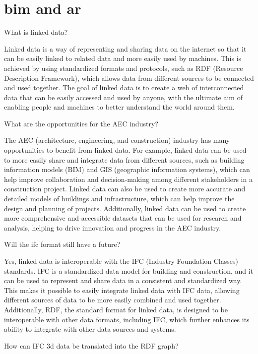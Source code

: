 \section*{\ac{bim} and \ac{ar}}
\begin{description}
	\me What is linked data?

	\gpt Linked data is a way of representing and sharing data on the internet so that it can be easily linked to related data and more easily used by machines. This is achieved by using standardized formats and protocols, such as RDF (Resource Description Framework), which allows data from different sources to be connected and used together. The goal of linked data is to create a web of interconnected data that can be easily accessed and used by anyone, with the ultimate aim of enabling people and machines to better understand the world around them.


	\me What are the opportunities for the AEC industry?

	\gpt The AEC (architecture, engineering, and construction) industry has many opportunities to benefit from linked data. For example, linked data can be used to more easily share and integrate data from different sources, such as building information models (BIM) and GIS (geographic information systems), which can help improve collaboration and decision-making among different stakeholders in a construction project. Linked data can also be used to create more accurate and detailed models of buildings and infrastructure, which can help improve the design and planning of projects. Additionally, linked data can be used to create more comprehensive and accessible datasets that can be used for research and analysis, helping to drive innovation and progress in the AEC industry.

	\me Will the ifc format still have a future?

	\gpt Yes, linked data is interoperable with the IFC (Industry Foundation Classes) standards. IFC is a standardized data model for building and construction, and it can be used to represent and share data in a consistent and standardized way. This makes it possible to easily integrate linked data with IFC data, allowing different sources of data to be more easily combined and used together. Additionally, RDF, the standard format for linked data, is designed to be interoperable with other data formats, including IFC, which further enhances its ability to integrate with other data sources and systems.

	\me How can IFC 3d data be translated into the RDF graph?


\end{description}
